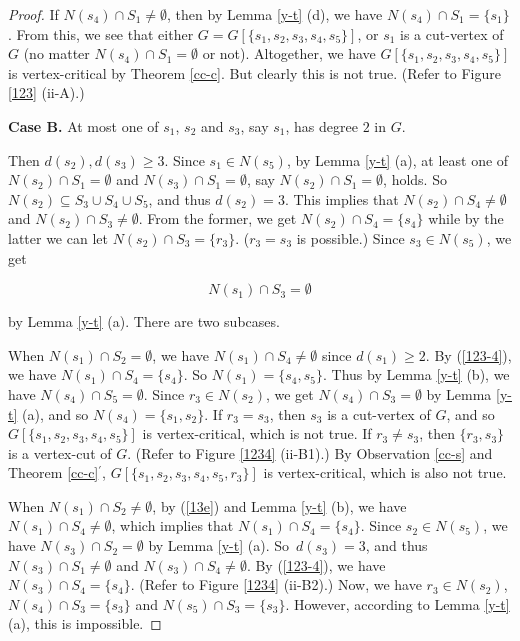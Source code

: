 \documentclass[a4paper,11pt]{article}
\numberwithin{equation}{section}
\begin{document}
\begin{proof}
If $N(s_4)\cap S_1\neq \emptyset$, then by Lemma \ref{y-t} (d), we have $N(s_4)\cap S_1=\{s_1\}$. From this, we see that either $G=G[\{s_1,s_2,s_3,s_4,s_5\}]$, or $s_1$ is a cut-vertex of $G$ (no matter $N(s_4)\cap S_1= \emptyset$ or not). Altogether, we have $G[\{s_1,s_2,s_3,s_4, s_5\}]$ is vertex-critical by Theorem \ref{cc-c}. But clearly this is not true. (Refer to Figure \ref{123} (ii-A).)

\smallskip
\textbf{Case B.} At most one of $s_1$, $s_2$ and $s_3$, say $s_1$, has degree $2$ in $G$.

Then $d(s_2),d(s_3)\geq3$. Since $s_1\in N(s_5)$,
by Lemma \ref{y-t} (a), at least one of $N(s_2)\cap S_1=\emptyset$ and $N(s_3)\cap S_1=\emptyset$, say $N(s_2)\cap S_1=\emptyset$, holds. So $N(s_2)\subseteq S_3\cup S_4\cup S_5$, and thus $d(s_2)=3$. This implies that $N(s_2)\cap S_4\neq\emptyset$ and $N(s_2)\cap S_3\neq\emptyset$. From the former, we get $N(s_2)\cap S_4=\{s_4\}$ while by the latter we can let $N(s_2)\cap S_3=\{r_3\}$. ($r_3=s_3$ is possible.) Since $s_3\in N(s_5)$, we get

\vspace{-5mm}
\begin{equation}
N(s_1)\cap S_3=\emptyset
\label{13e}
\end{equation}

\vspace{-1mm}
\noindent by Lemma \ref{y-t} (a). There are two subcases.

When $N(s_1)\cap S_2=\emptyset$, we have $N(s_1)\cap S_4\neq\emptyset$ since $d(s_1)\geq2$. By (\ref{123-4}), we have $N(s_1)\cap S_4=\{s_4\}$. So $N(s_1)=\{s_4,s_5\}$. Thus by Lemma \ref{y-t} (b), we have $N(s_4)\cap S_5=\emptyset$. Since $r_3\in N(s_2)$, we get $N(s_4)\cap S_3=\emptyset$ by Lemma \ref{y-t} (a), and so $N(s_4)=\{s_1,s_2\}$. If $r_3=s_3$, then $s_3$ is a cut-vertex of $G$, and so $G[\{s_1,s_2,s_3,s_4,s_5\}]$ is vertex-critical, which is not true. If $r_3\neq s_3$, then $\{r_3,s_3\}$ is a vertex-cut of $G$. (Refer to Figure \ref{1234} (ii-B1).) By Observation \ref{cc-s} and Theorem \ref{cc-c}$^\prime$,  $G[\{s_1,s_2,s_3,s_4,s_5,r_3\}]$ is vertex-critical, which is also not true.



When $N(s_1)\cap S_2\neq\emptyset$, by (\ref{13e}) and Lemma \ref{y-t} (b), we have $N(s_1)\cap S_4\neq\emptyset$, which implies that $N(s_1)\cap S_4=\{s_4\}$. Since $s_2\in N(s_5)$, we have $N(s_3)\cap S_2=\emptyset$ by  Lemma \ref{y-t} (a). So~$d(s_3)=3$, and thus $N(s_3)\cap S_1\neq\emptyset$ and $N(s_3)\cap S_4\neq\emptyset$. By (\ref{123-4}), we have $N(s_3)\cap S_4=\{s_4\}$. (Refer to Figure \ref{1234} (ii-B2).) Now, we have $r_3\in N(s_2)$, $N(s_4)\cap S_3=\{s_3\}$ and $N(s_5)\cap S_3=\{s_3\}$. However, according to Lemma \ref{y-t} (a), this is impossible.





\end{proof}
\end{document}

